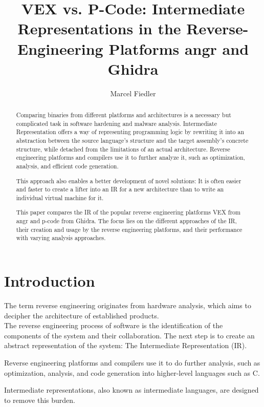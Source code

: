 \documentclass[seminar]{plai}
\title{VEX vs. P-Code: Intermediate Representations in the Reverse-Engineering Platforms angr and Ghidra}
\author{Marcel Fiedler}
\begin{document}
\maketitle

\begin{abstract}

\noindent Comparing binaries from different platforms and architectures is a necessary but complicated task in software hardening and malware analysis. Intermediate Representation offers a way of representing programming logic by rewriting it into an abstraction between the source language's structure and the target assembly's concrete structure, while detached from the limitations of an actual architecture. Reverse engineering platforms and compilers use it to further analyze it, such as optimization, analysis, and efficient code generation.

This approach also enables a better development of novel solutions: It is often easier and faster to create a lifter into an IR for a new architecture than to write an individual virtual machine for it.

\noindent This paper compares the IR of the popular reverse engineering platforms VEX from angr and p-code from Ghidra.
The focus lies on the different approaches of the IR, their creation and usage by the reverse engineering platforms, and their performance with varying analysis approaches.
\end{abstract}

\section{Introduction}
\label{sec:introduction}

The term reverse engineering originates from hardware analysis, which aims to decipher the architecture of established products.\cite{reverse-engineering-design-recovery-taxonomy}\\
The reverse engineering process of software is the identification of the components of the system and their collaboration. The next step is to create an abstract representation of the system: The Intermediate Representation (IR).

Reverse engineering platforms and compilers use it to do further analysis, such as optimization, analysis, and code generation into higher-level languages such as C.

Intermediate representations, also known as intermediate languages, are designed to remove this burden.
\end{document}
